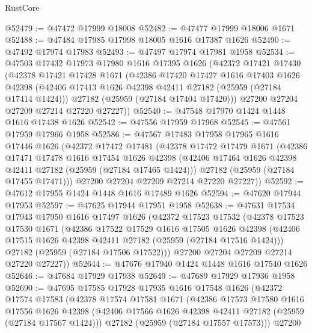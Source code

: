\begin{lexlean}{RustCore}
\begin{coremodule}
@52479 := @47472 @17999 @18008
@52482 := @47477 @17999 @18006 @1671
@52488 := @47484 @17985 @17998 @18005 @1616 @17387 @1626
@52490 := @47492 @17974 @17983
@52493 := @47497 @17974 @17981 @1958
@52534 := @47503
    @17432
    @17973
    @17980
    @1616
    @17395
    @1626
    (@42372
      @17421
      @17430
      (@42378
        @17421
        @17428
        @1671
        (@42386
          @17420
          @17427
          @1616
          @17403
          @1626
          @42398
          (@42406 @17413 @1626 @42398 @42411 @27182 (@25959 (@27184 @17414 @1424)))
          @27182
          (@25959 (@27184 @17404 @17420)))
        @27200
        @27204
        @27209
        @27214
        @27220
        @27227))
@52540 := @47548 @17970 @1424 @1448 @1616 @17438 @1626
@52542 := @47556 @17959 @17968
@52545 := @47561 @17959 @17966 @1958
@52586 := @47567
    @17483
    @17958
    @17965
    @1616
    @17446
    @1626
    (@42372
      @17472
      @17481
      (@42378
        @17472
        @17479
        @1671
        (@42386
          @17471
          @17478
          @1616
          @17454
          @1626
          @42398
          (@42406 @17464 @1626 @42398 @42411 @27182 (@25959 (@27184 @17465 @1424)))
          @27182
          (@25959 (@27184 @17455 @17471)))
        @27200
        @27204
        @27209
        @27214
        @27220
        @27227))
@52592 := @47612 @17955 @1424 @1448 @1616 @17489 @1626
@52594 := @47620 @17944 @17953
@52597 := @47625 @17944 @17951 @1958
@52638 := @47631
    @17534
    @17943
    @17950
    @1616
    @17497
    @1626
    (@42372
      @17523
      @17532
      (@42378
        @17523
        @17530
        @1671
        (@42386
          @17522
          @17529
          @1616
          @17505
          @1626
          @42398
          (@42406 @17515 @1626 @42398 @42411 @27182 (@25959 (@27184 @17516 @1424)))
          @27182
          (@25959 (@27184 @17506 @17522)))
        @27200
        @27204
        @27209
        @27214
        @27220
        @27227))
@52644 := @47676 @17940 @1424 @1448 @1616 @17540 @1626
@52646 := @47684 @17929 @17938
@52649 := @47689 @17929 @17936 @1958
@52690 := @47695
    @17585
    @17928
    @17935
    @1616
    @17548
    @1626
    (@42372
      @17574
      @17583
      (@42378
        @17574
        @17581
        @1671
        (@42386
          @17573
          @17580
          @1616
          @17556
          @1626
          @42398
          (@42406 @17566 @1626 @42398 @42411 @27182 (@25959 (@27184 @17567 @1424)))
          @27182
          (@25959 (@27184 @17557 @17573)))
        @27200

\end{coremodule}
\end{lexlean}
